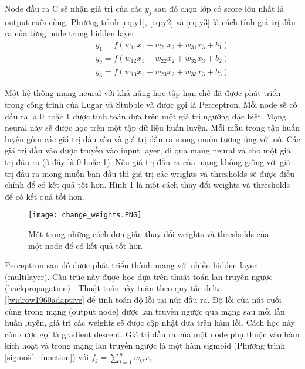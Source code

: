 Node đầu ra C sẽ nhận giá trị của các $y_j$ sau đó chọn lớp có score lớn nhất là output cuối cùng. Phương trình \ref{eq:y1}, \ref{eq:y2} và \ref{eq:y3} là cách tính giá trị đầu ra của từng node trong hidden layer
\begin{eqnarray}
\label{eq:y1}
\hspace{1cm} y_{1} = f(w_{11}x_1 + w_{21}x_2 + w_{31}x_3  + b_1)\\
\label{eq:y2}
\hspace{1cm} y_{2} = f(w_{12}x_1 + w_{22}x_2 + w_{32}x_3  + b_2)\\
\label{eq:y3}
\hspace{1cm} y_{3} = f(w_{13}x_1 + w_{23}x_2 + w_{33}x_3  + b_3)
\end{eqnarray}

Một hệ thống mạng neural với khả năng học tập hạn chế đã được phát triển trong công trình của Lugar và Stubble \cite{luger2005artificial} và được gọi là Perceptron. Mỗi node sẽ có đầu ra là 0 hoặc 1 được tính toán dựa trên một giá trị ngưỡng đặc biệt. Mạng neural này sẽ được học trên một tập dữ liệu huấn luyện. Mỗi mẫu trong tập huấn luyện gốm các giá trị đầu vào và giá trị đầu ra mong muốn tương ứng với nó. Các giá trị đầu vào được truyền vào input layer, đi qua mạng neural và cho một giá trị đầu ra (ở đây là 0 hoặc 1). Nếu giá trị đầu ra của mạng không giống với giá trị đầu ra mong muốn ban đầu thì giá trị các weights và thresholds sẽ được điều chỉnh để có kết quả tốt hơn. Hình \ref{fig:change_weights} là một cách thay đổi weights và thresholds để có kết quả tốt hơn.

\begin{figure}[h!]
	\centering
	\captionsetup{width=0.7\textwidth}
	\texttt{[image: change\_weights.PNG]}
	\caption{Một trong những cách đơn giản thay đổi weights và thresholds của một node để có kết quả tốt hơn}
    \label{fig:change_weights}
\end{figure}

Perceptron sau đó được phát triển thành mạng với nhiều hidden layer (multilayer). Cấu trúc này được học dựa trên thuật toán lan truyền ngược (backpropagation) \cite{sampson1987parallel}. Thuật toán này tuân theo quy tắc delta [\ref{widrow1960adaptive} để tính toán độ lỗi tại nút đầu ra. Độ lỗi của nút cuối cùng trong mạng (output node) được lan truyền ngược qua mạng sau mỗi lần huấn luyện, giá trị các weights sẽ 	được cập nhật dựa trên hàm lỗi. Cách học này còn được gọi là gradient descent. 
Giá trị đầu ra của một node phụ thuộc vào hàm kích hoạt và trong mạng lan truyền ngược là một hàm sigmoid (Phương trình \ref{sigmoid_function}) với $f_{j} = \sum_{i=1}^{n} {w_{ij}x_i}$

